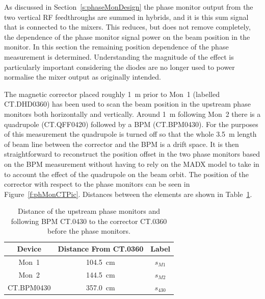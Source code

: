 
As discussed in Section~\ref{s:phaseMonDesign} the phase monitor output from the two vertical RF feedthroughs are summed in hybrids, and it is this sum signal that is connected to the mixers. This reduces, but does not remove completely, the dependence of the phase monitor signal power on the beam position in the monitor. In this section the remaining position dependence of the phase measurement is determined. Understanding the magnitude of the effect is particularly important considering the diodes are no longer used to power normalise the mixer output as originally intended.

The magnetic corrector placed roughly 1~m prior to Mon~1 (labelled CT.DHD0360) has been used to scan the beam position in the upstream phase monitors both horizontally and vertically. Around 1~m following Mon~2 there is a quadrupole (CT.QFF0420) followed by a BPM (CT.BPM0430). For the purposes of this measurement the quadrupole is turned off so that the whole 3.5~m length of beam line between the corrector and the BPM is a drift space. It is then straightforward to reconstruct the position offset in the two phase monitors based on the BPM measurement without having to rely on the MADX model to take in to account the effect of the quadrupole on the beam orbit. The position of the corrector with respect to the phase monitors can be seen in Figure~\ref{f:phMonCTPic}. Distances between the elements are shown in Table~\ref{t:distanceFromCT360}.


\begin{table}
  \begin{center}
    \begin{tabular}{|c c c|}
	   \hline
       Device & Distance From CT.0360 & Label\\ \hline
       Mon~1 & 104.5~cm & \(s_{M1}\)\\ 
       Mon~2 & 144.5~cm & \(s_{M2}\)\\
       CT.BPM0430 & 357.0~cm & \(s_{430}\) \\ \hline
    \end{tabular}
    \caption{Distance of the upstream phase monitors and following BPM CT.0430 to the corrector CT.0360 before the phase monitors.}
  	\label{t:distanceFromCT360}
  \end{center}
\end{table}

